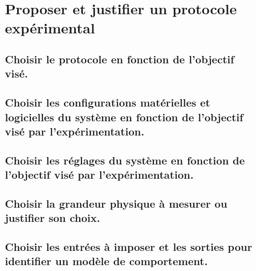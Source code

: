 \documentclass[10pt,fleqn]{article}
\begin{document}
\section{Proposer et justifier un protocole expérimental} 

\subsection{Choisir le protocole en fonction de l'objectif visé.} 

\begin{multicols}{2} 

\end{multicols}

\subsection{Choisir les configurations matérielles et logicielles du système en fonction de l'objectif visé par l'expérimentation.} 

\begin{multicols}{2} 

\end{multicols}

\subsection{Choisir les réglages du système en fonction de l'objectif visé par l'expérimentation.} 

\begin{multicols}{2} 

\end{multicols}

\subsection{Choisir la grandeur physique à mesurer ou justifier son choix.} 

\begin{multicols}{2} 

\end{multicols}

\subsection{Choisir les entrées à imposer et les sorties pour identifier un modèle de comportement.} 

\begin{multicols}{2} 

\end{multicols}
\end{document}
